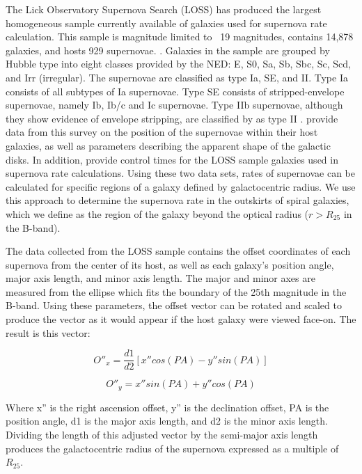 \documentclass[apj]{emulateapj}
\begin{document}
The Lick Observatory Supernova Search (LOSS) has produced the largest homogeneous sample currently available of galaxies used for supernova rate calculation. This sample is magnitude limited to ~19 magnitudes, contains 14,878 galaxies, and hosts 929 supernovae. \citep{Leaman11}. Galaxies in the sample are grouped by Hubble type into eight classes provided by the NED: E, S0, Sa, Sb, Sbc, Sc, Scd, and Irr (irregular). The supernovae are classified as type Ia, SE, and II. Type Ia consists of all subtypes of Ia supernovae. Type SE consists of stripped-envelope supernovae, namely Ib, Ib/c and Ic supernovae. Type IIb supernovae, although they show evidence of envelope stripping, are classified by \citet{Leaman11} as type II \citep{Graur17}. \citet{Leaman11} provide data from this survey on the position of the supernovae within their host galaxies, as well as parameters describing the apparent shape of the galactic disks. In addition, \citet{Graur17} provide control times for the LOSS sample galaxies used in supernova rate calculations. Using these two data sets, rates of supernovae can be calculated for specific regions of a galaxy defined by galactocentric radius. We use this approach to determine the supernova rate in the outskirts of spiral galaxies, which we define as the region of the galaxy beyond the optical radius ($r > R_{25}$ in the B-band).

The data \citet{Leaman11} collected from the LOSS sample contains the offset coordinates of each supernova from the center of its host, as well as each galaxy's position angle, major axis length, and minor axis length. The major and minor axes are measured from the ellipse which fits the boundary of the 25th magnitude in the B-band. Using these parameters, the offset vector can be rotated and scaled to produce the vector as it would appear if the host galaxy were viewed face-on. The result is this vector:

\begin{equation}
O''_x=\frac{d1}{d2}[x''cos(PA)-y''sin(PA)]
\end{equation}

\begin{equation}
O''_y=x''sin(PA)+y''cos(PA)
\end{equation}

Where x'' is the right ascension offset, y'' is the declination offset, PA is the position angle, d1 is the major axis length, and d2 is the minor axis length. Dividing the length of this adjusted vector by the semi-major axis length produces the galactocentric radius of the supernova expressed as a multiple of $R_{25}$.
\end{document}
